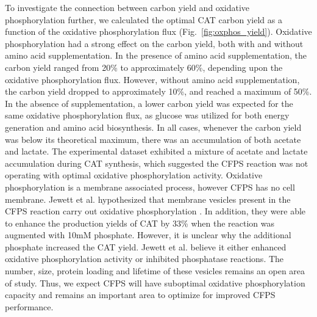 \documentclass[journal=asbcd6,manuscript=article]{achemso}
\begin{document}


To investigate the connection between carbon yield and oxidative phosphorylation further,
we calculated the optimal CAT carbon yield as a function of the oxidative phosphorylation flux (Fig.~\ref{fig:oxphos_yield}).
Oxidative phosphorylation had a strong effect on the carbon yield, both with and without amino acid supplementation.
In the presence of amino acid supplementation, the carbon yield ranged from 20\% to approximately 60\%,
depending upon the oxidative phosphorylation flux.
However, without amino acid supplementation, the carbon yield dropped to approximately 10\%, and reached a maximum of 50\%.
In the absence of supplementation, a lower carbon yield was expected for the same oxidative phosphorylation flux, as glucose was utilized for both energy generation and amino acid biosynthesis.
In all cases, whenever the carbon yield was below its theoretical maximum, there was an accumulation of both acetate and lactate.
The experimental dataset exhibited a mixture of acetate and lactate accumulation during CAT synthesis, which suggested the CFPS reaction was not
operating with optimal oxidative phosphorylation activity.
Oxidative phosphorylation is a membrane associated process, however CFPS has no cell membrane.
Jewett et al. hypothesized that membrane vesicles present in the CFPS reaction carry out oxidative phosphorylation \cite{Jewett:2008aa}.
In addition, they were able to enhance the production yields of CAT by 33\% when the reaction was augmented with 10mM phosphate.
However, it is unclear why the additional phosphate increased the CAT yield.
Jewett et al. believe it either enhanced oxidative phosphorylation activity or inhibited phosphatase reactions.
The number, size, protein loading and lifetime of these vesicles remains an open area of study.
Thus, we expect CFPS will have suboptimal oxidative phosphorylation capacity and remains an important area to optimize for improved CFPS performance.



\end{document}
